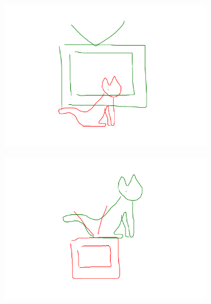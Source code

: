 \begin{figure}[ht]
    \centering
    \captionsetup[subfigure]{labelformat=empty}
        \begin{subfigure}{0.45\textwidth}
            \centering
            \includegraphics[width=\textwidth]{figures/television_behind_cat.pdf}
            \caption{\protect{}}
        \end{subfigure}
        \hfill
        \begin{subfigure}{0.45\textwidth}
            \centering
            \includegraphics[width=\textwidth]{figures/cat_on_television.pdf}
            \caption{\protect{}}
        \end{subfigure}
        

\end{figure}
